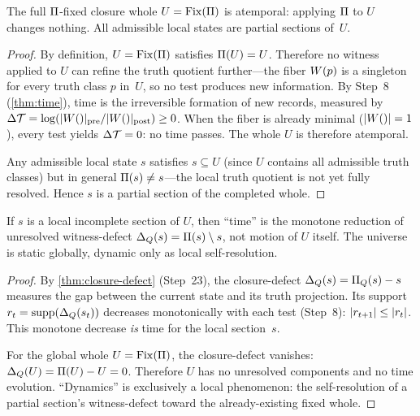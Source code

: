 \begin{theorem}
\label{thm:whole-before-time}
The full $\Pi$-fixed closure whole $U = \mathrm{Fix}(\Pi)$ is
atemporal: applying $\Pi$ to $U$ changes nothing.  All admissible
local states are partial sections of~$U$.
\begin{proof}
By definition, $U = \mathrm{Fix}(\Pi)$ satisfies $\Pi(U) = U$.
Therefore no witness applied to $U$ can refine the truth quotient
further---the fiber $W(p)$ is a singleton for every truth class
$p$ in~$U$, so no test produces new information.  By Step~8
(\cref{thm:time}), time is the irreversible formation of new records,
measured by $\Delta\mathcal{T} = \log(|W()|_{\mathrm{pre}} /
|W()|_{\mathrm{post}}) \geq 0$.  When the fiber is already
minimal ($|W()| = 1$), every test yields $\Delta\mathcal{T} = 0$: no time
passes.  The whole $U$ is therefore atemporal.

Any admissible local state $s$ satisfies $s \subseteq U$ (since $U$
contains all admissible truth classes) but in general
$\Pi(s) \neq s$---the local truth quotient is not yet fully resolved.
Hence $s$ is a partial section of the completed whole.
\end{proof}
\end{theorem}

\begin{theorem}
\label{thm:time-local-defect}
If $s$ is a local incomplete section of $U$, then ``time'' is the
monotone reduction of unresolved witness-defect
$\Delta_{Q}(s) = \Pi(s) \setminus s$, not motion of $U$
itself.  The universe is static globally, dynamic only as local
self-resolution.
\begin{proof}
By \cref{thm:closure-defect} (Step~23), the closure-defect
$\Delta_{Q}(s) = \Pi_Q(s) - s$ measures the gap between the
current state and its truth projection.  Its support
$r_t = \mathrm{supp}(\Delta_{Q}(s_t))$ decreases
monotonically with each test (Step~8): $|r_{t+1}| \leq
|r_t|$.  This monotone decrease \emph{is} time for the local
section~$s$.

For the global whole $U = \mathrm{Fix}(\Pi)$, the closure-defect
vanishes: $\Delta_{Q}(U) = \Pi(U) - U = 0$.  Therefore $U$
has no unresolved components and no time evolution.  ``Dynamics'' is
exclusively a local phenomenon: the self-resolution of a partial
section's witness-defect toward the already-existing fixed whole.
\end{proof}
\end{theorem}

